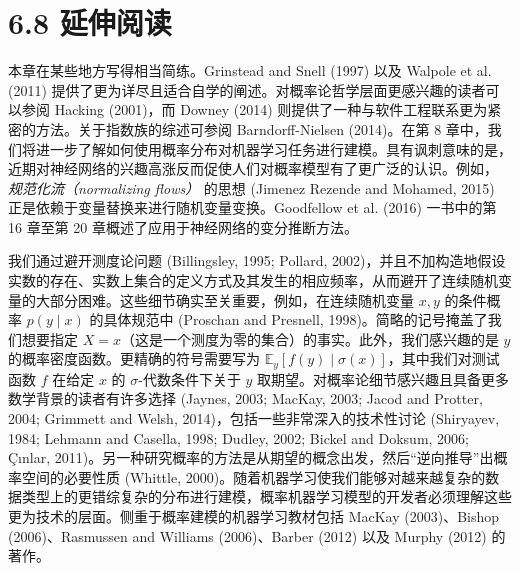 \section*{6.8 延伸阅读}
\label{sec:6.8}

本章在某些地方写得相当简练。Grinstead and Snell (1997) 以及 Walpole et al. (2011) 提供了更为详尽且适合自学的阐述。对概率论哲学层面更感兴趣的读者可以参阅 Hacking (2001)，而 Downey (2014) 则提供了一种与软件工程联系更为紧密的方法。关于指数族的综述可参阅 Barndorff-Nielsen (2014)。在第 8 章中，我们将进一步了解如何使用概率分布对机器学习任务进行建模。具有讽刺意味的是，近期对神经网络的兴趣高涨反而促使人们对概率模型有了更广泛的认识。例如， \emph{规范化流（normalizing flows）} 的思想 (Jimenez Rezende and Mohamed, 2015) 正是依赖于变量替换来进行随机变量变换。Goodfellow et al. (2016) 一书中的第 16 章至第 20 章概述了应用于神经网络的变分推断方法。

我们通过避开测度论问题 (Billingsley, 1995; Pollard, 2002)，并且不加构造地假设实数的存在、实数上集合的定义方式及其发生的相应频率，从而避开了连续随机变量的大部分困难。这些细节确实至关重要，例如，在连续随机变量 $ x, y $ 的条件概率 $ p(y \mid x) $ 的具体规范中 (Proschan and Presnell, 1998)。简略的记号掩盖了我们想要指定 $ X = x $（这是一个测度为零的集合）的事实。此外，我们感兴趣的是 $ y $ 的概率密度函数。更精确的符号需要写为 $ \mathbb{E}_y[f(y) \mid \sigma(x)] $，其中我们对测试函数 $ f $ 在给定 $ x $ 的 $ \sigma $-代数条件下关于 $ y $ 取期望。对概率论细节感兴趣且具备更多数学背景的读者有许多选择 (Jaynes, 2003; MacKay, 2003; Jacod and Protter, 2004; Grimmett and Welsh, 2014)，包括一些非常深入的技术性讨论 (Shiryayev, 1984; Lehmann and Casella, 1998; Dudley, 2002; Bickel and Doksum, 2006; Çınlar, 2011)。另一种研究概率的方法是从期望的概念出发，然后“逆向推导”出概率空间的必要性质 (Whittle, 2000)。随着机器学习使我们能够对越来越复杂的数据类型上的更错综复杂的分布进行建模，概率机器学习模型的开发者必须理解这些更为技术的层面。侧重于概率建模的机器学习教材包括 MacKay (2003)、Bishop (2006)、Rasmussen and Williams (2006)、Barber (2012) 以及 Murphy (2012) 的著作。

